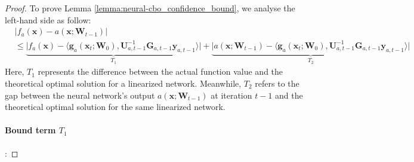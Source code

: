 \begin{proof}
To prove Lemma \ref{lemma:neural-cbo_confidence_bound}, we analyse the left-hand side as follow:
\begin{align*}
    & \lvert f_a(\mathbf{x}) - a(\mathbf{x}; \mathbf{W}_{t-1}) \rvert 
    \\
    & \le \underbrace{\lvert f_a(\mathbf{x}) - \langle \mathbf{g}_a(\mathbf{x}_{t};\mathbf{W}_{0}),\mathbf{U}_{a,t-1}^{-1}\mathbf{G}_{a,t-1}\mathbf{y}_{a,t-1} \rangle  \rvert}_{T_1} + \underbrace{\lvert a(\mathbf{x}; \mathbf{W}_{t-1}) - \langle \mathbf{g}_a(\mathbf{x}_{t};\mathbf{W}_{0}),\mathbf{U}_{a,t-1}^{-1}\mathbf{G}_{a,t-1}\mathbf{y}_{a,t-1} \rangle  \rvert}_{T_2}
\end{align*}
Here, $T_1$ represents the difference between the actual function value and the theoretical optimal solution for a linearized network. Meanwhile, $T_2$ refers to the gap between the neural network's output $a(\mathbf{x}; \boldsymbol{W}_{t-1})$ at iteration $t-1$ and the theoretical optimal solution for the same linearized network.
\paragraph{Bound term $T_1$}:


\end{proof}
